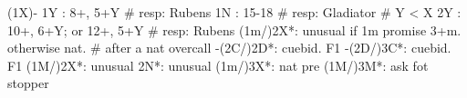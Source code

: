 (1X)-
1Y : 8+, 5+Y  # resp: Rubens
1N : 15-18  # resp: Gladiator
# Y < X
2Y : 10+, 6+Y; or 12+, 5+Y  # resp: Rubens
(1m/)2X*: unusual if 1m promise 3+m. otherwise nat.
        # after a nat overcall
        -(2C/)2D*: cuebid. F1
        -(2D/)3C*: cuebid. F1
(1M/)2X*: unusual
2N*: unusual
(1m/)3X*: nat pre
(1M/)3M*: ask fot stopper
